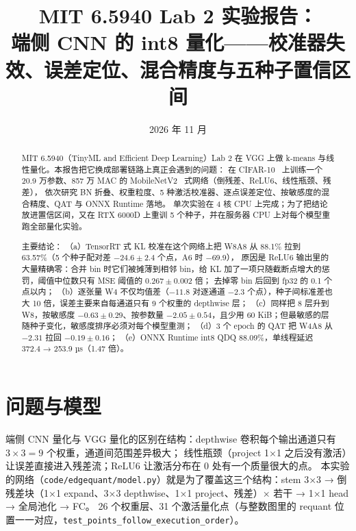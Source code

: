 \documentclass[11pt,a4paper]{ctexart}
\title{MIT 6.5940 Lab 2 实验报告：\\端侧 CNN 的 int8 量化——校准器失效、误差定位、混合精度与五种子置信区间}
\author{\authorline}
\date{2026 年 11 月}
\begin{document}
\maketitle

\begin{abstract}
MIT 6.5940（TinyML and Efficient Deep Learning）Lab 2 在 VGG 上做 k-means 与线性量化。本报告把它换成部署链路上真正会遇到的问题：
在 CIFAR-10~\cite{cifar} 上训练一个 20.9 万参数、857 万 MAC 的 MobileNetV2~\cite{mobilenetv2} 式网络（倒残差、ReLU6、线性瓶颈、残差），
依次研究 BN 折叠、权重粒度、5 种激活校准器、逐点误差定位、按敏感度的混合精度、QAT 与 ONNX Runtime 落地。
单次实验在 4 核 CPU 上完成；为了把结论放进置信区间，又在 RTX 6000D 上重训 5 个种子，并在服务器 CPU 上对每个模型重跑全部量化实验。

主要结论：
（a）TensorRT 式 KL 校准在这个网络上把 W8A8 从 88.1\% 拉到 63.57\%（5 个种子配对差 $-24.6\pm2.4$ 个点，A6 时 $-69.9$），
原因是 ReLU6 输出里的大量精确零：合并 bin 时它们被摊薄到相邻 bin，给 KL 加了一项只随截断点增大的惩罚，阈值中位数只有 MSE 阈值的 $0.267\pm0.002$ 倍；
去掉零 bin 后回到 fp32 的 0.1 个点以内；
（b）逐张量 W4 不仅均值差（$-11.8$ 对逐通道 $-2.3$ 个点），种子间标准差也大 10 倍，误差主要来自每通道只有 9 个权重的 depthwise 层；
（c）同样把 8 层升到 W8，按敏感度 $-0.63\pm0.29$、按参数量 $-2.05\pm0.54$，且少用 60 KiB；但最敏感的层随种子变化，敏感度排序必须对每个模型重测；
（d）3 个 epoch 的 QAT 把 W4A8 从 $-2.31$ 拉回 $-0.19\pm0.16$；
（e）ONNX Runtime int8 QDQ 88.09\%，单线程延迟 372.4 → 253.9 µs（1.47 倍）。
\end{abstract}

\tableofcontents
\newpage

\section{问题与模型}

端侧 CNN 量化与 VGG 量化的区别在结构：depthwise 卷积每个输出通道只有 $3\times3=9$ 个权重，通道间范围差异极大；
线性瓶颈（project 1×1 之后没有激活）让误差直接进入残差流；ReLU6 让激活分布在 0 处有一个质量很大的点。
本实验的网络（\texttt{code/edgequant/model.py}）就是为了覆盖这三个结构：stem 3×3 → 倒残差块（1×1 expand、3×3 depthwise、1×1 project、残差）× 若干 → 1×1 head → 全局池化 → FC。
26 个权重层、31 个激活量化点（与整数图里的 requant 位置一一对应，\texttt{test\_points\_follow\_execution\_order}）。
\end{document}
